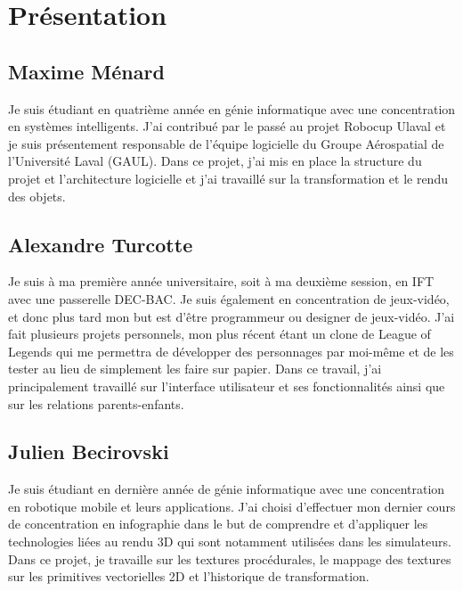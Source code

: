 \section{Présentation}
\label{s:présentation}

\subsection{Maxime Ménard}
Je suis étudiant en quatrième année en génie informatique avec une concentration en systèmes intelligents.
J'ai contribué par le passé au projet Robocup Ulaval et je suis présentement responsable de l'équipe logicielle du Groupe Aérospatial de l'Université Laval (GAUL).
Dans ce projet, j'ai mis en place la structure du projet et l'architecture logicielle et j'ai travaillé sur la transformation et le rendu des objets.

\subsection{Alexandre Turcotte}
Je suis à ma première année universitaire, soit à ma deuxième session, en IFT avec une passerelle DEC-BAC.
Je suis également en concentration de jeux-vidéo, et donc plus tard mon but est d’être programmeur ou designer de jeux-vidéo.
J’ai fait plusieurs projets personnels, mon plus récent étant un clone de League of Legends qui me permettra de développer des personnages par moi-même et de les tester au lieu de simplement les faire sur papier.
Dans ce travail, j’ai principalement travaillé sur l’interface utilisateur et ses fonctionnalités ainsi que sur les relations parents-enfants.

\subsection{Julien Becirovski}
Je suis étudiant en dernière année de génie informatique avec une concentration en robotique mobile et leurs applications. J'ai choisi d'effectuer mon dernier cours de concentration en infographie dans le but de comprendre et d'appliquer les technologies liées au rendu 3D qui sont notamment utilisées dans les simulateurs. Dans ce projet, je travaille sur les textures procédurales, le mappage des textures sur les primitives vectorielles 2D et l'historique de transformation. 
